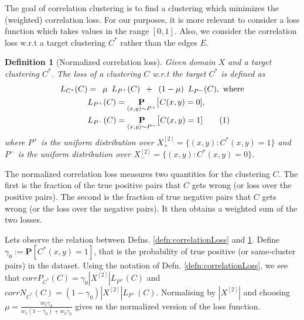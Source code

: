 \documentclass[12pt]{article}
\newtheorem{definition}[theorem]{Definition}
\newcommand{\mb}{\mathbf}
\newcommand\numberthis{\addtocounter{equation}{1}\tag{\theequation}}
\begin{document}
The goal of correlation clustering is to find a clustering which minimizes the (weighted) correlation loss. For our purposes, it is more relevant to consider a loss function which takes values in the range $[0, 1]$. Also, we consider the correlation loss w.r.t a target clustering $C^*$ rather than the edges $E$.

\begin{definition}[Normalized correlation loss\cite{kushagra2018semisupervised}]
\label{defn:normalizedCorrelationLoss}
Given domain $X$ and a target clustering $C^*$. The loss of a clustering $C$ w.r.t the target $C^*$ is defined as
\begin{align*}
  L_{C^*}(C) &= \enspace  \mu \enspace L_{P^+}(C) \enspace+\enspace (1-\mu) \enspace L_{P^-}(C), \text{ where} \\
  &L_{P^+}(C) = \underset{(x, y) \sim P^+}{\mb P} \big[ C(x, y) = 0 ],\\
  & L_{P^-}(C) = \underset{(x, y) \sim P^-}{\mb P} \big[ C(x, y) = 1] \numberthis\label{eqn:RCCV2}
\end{align*}
where $P^+$ is the uniform distribution over $X^{[2]}_+ = \{(x, y) : C^*(x, y) = 1\}$ and $P^-$ is the uniform distribution over $X^{[2]}_- = \{(x, y): C^*(x, y) = 0\}$. 
\end{definition}
The normalized correlation loss measures two quantities for the clustering $C$. The first is the fraction of the true positive pairs that $C$ gets wrong (or loss over the positive pairs). The second is the fraction of true negative pairs that $C$ gets wrong (or the loss over the negative pairs). It then obtains a weighted sum of the two losses. 
  
Lets observe the relation between Defns. \ref{defn:correlationLoss} and \ref{defn:normalizedCorrelationLoss}. Define $\gamma_0 := \mb P[C^*(x, y) = 1]$, that is the probability of true positive (or same-cluster pairs) in the dataset. Using the notation of Defn. \ref{defn:correlationLoss}, we see that $corrP_{C^*}(C) = \gamma_0|X^{[2]}| L_{P^+}(C)$ and $corrN_{C^*}(C) = (1-\gamma_0)|X^{[2]}| L_{P^-}(C)$. Normalising by $|X^{[2]}|$ and choosing $\mu = \frac{w_2 \gamma_0}{w_1 (1-\gamma_0) + w_2 \gamma_0}$ gives us the normalized version of the loss function.
\end{document}

